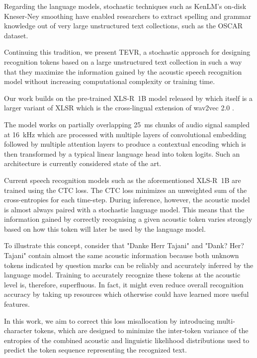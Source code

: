 \documentclass{article} \usepackage{iclr2022_conference,times}
\begin{document}
Regarding the language models, stochastic techniques such as KenLM's on-disk Kneser-Ney smoothing \citep{kenlm,kenlm-smoothing} have enabled researchers to extract spelling and grammar knowledge out of very large unstructured text collections, such as the OSCAR dataset.

Continuing this tradition, we present TEVR, a stochastic approach for designing recognition tokens based on a large unstructured text collection in such a way that they maximize the information gained by the acoustic speech recognition model without increasing computational complexity or training time.

Our work builds on the pre-trained XLS-R~1B model released by \citet{xlsr_1B_2021}
which itself is a larger variant of XLSR \citep{xlsr_2020}
which is the cross-lingual extension of wav2vec 2.0 \citep{wav2vec2_2020}. 

The model works on partially overlapping 25~ms chunks of audio signal sampled at 16~kHz
which are processed with multiple layers of convolutional embedding 
followed by multiple attention layers to produce a contextual encoding
which is then transformed by a typical linear language head into token logits.
Such an architecture is currently considered state of the art.

Current speech recognition models such as the aforementioned XLS-R~1B are trained using the CTC loss.
The CTC loss minimizes an unweighted sum of the cross-entropies for each time-step. During inference, however, the acoustic model is almost always paired with a stochastic language model. This means that the information gained by correctly recognising a given acoustic token varies strongly based on how this token will later be used by the language model.

To illustrate this concept, consider that "Danke Herr Tajani" and "Dank? Her? Tajani" contain almost the same acoustic information because both unknown tokens indicated by question marks can be reliably and accurately inferred by the language model. Training to accurately recognize these tokens at the acoustic level is, therefore, superfluous. In fact, it might even reduce overall recognition accuracy by taking up resources which otherwise could have learned more useful features. 

In this work, we aim to correct this loss misallocation by introducing multi-character tokens, which are designed to minimize the inter-token variance of the entropies of the combined acoustic and linguistic likelihood distributions used to predict the token sequence representing the recognized text.
\end{document}
